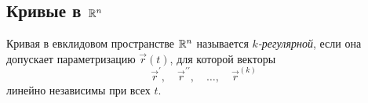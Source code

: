 %
%
%
%
%
%

\subsection{Кривые в $\mathbb{R}^n$}

\begin{definition}
	Кривая в евклидовом пространстве $\mathbb{R}^n$ называется \textit{$k$-регулярной}, если она допускает параметризацию $\vec{r}(t)$, для которой векторы
	\[
		\vec{r}^\prime,\quad \vec{r}^{\prime\prime},\quad \ldots, \quad \vec{r}^{(k)}
	\]
	линейно независимы при всех $t$.
\end{definition}

